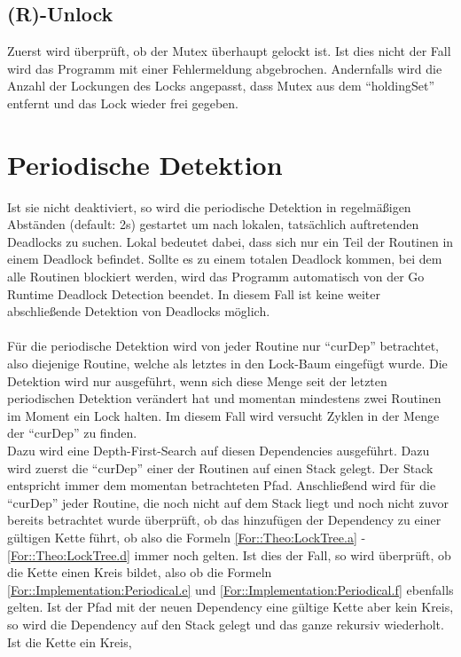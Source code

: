\subsection{(R)-Unlock}
Zuerst wird überprüft, ob der Mutex überhaupt gelockt ist. Ist dies nicht der 
Fall wird das Programm mit einer Fehlermeldung abgebrochen. Andernfalls
wird die Anzahl der Lockungen des Locks angepasst, dass Mutex aus dem 
``holdingSet'' entfernt und das Lock wieder frei gegeben.

\section{Periodische Detektion} \label{Kap::Implementation:Periodical}
Ist sie nicht deaktiviert, so wird die periodische Detektion in regelmäßigen 
Abständen (default: 2s) gestartet
um nach lokalen, tatsächlich auftretenden Deadlocks zu suchen. Lokal bedeutet 
dabei, dass sich nur ein Teil der Routinen in einem Deadlock befindet. Sollte 
es zu einem totalen Deadlock kommen, bei dem alle Routinen blockiert werden, 
wird das Programm automatisch von der Go Runtime Deadlock Detection beendet. In 
diesem Fall ist keine weiter abschließende Detektion von Deadlocks möglich.\\\\
Für die periodische Detektion wird von jeder Routine nur ``curDep'' betrachtet,
also diejenige Routine, welche als letztes in den Lock-Baum eingefügt wurde. 
Die Detektion wird nur ausgeführt, wenn sich diese Menge seit der letzten 
periodischen Detektion verändert hat und momentan mindestens zwei Routinen im 
Moment ein Lock halten.
Im diesem Fall wird versucht Zyklen in der Menge der ``curDep'' zu finden.\\
Dazu wird eine Depth-First-Search auf diesen Dependencies ausgeführt. Dazu wird 
zuerst die ``curDep'' einer der Routinen auf einen Stack gelegt. Der Stack 
entspricht immer dem momentan betrachteten Pfad. Anschließend wird für 
die ``curDep'' jeder Routine, die noch nicht auf dem Stack liegt und noch 
nicht zuvor bereits betrachtet wurde überprüft,
ob das hinzufügen der Dependency zu einer gültigen Kette führt, ob also 
die Formeln \ref{For::Theo:LockTree.a} - \ref{For::Theo:LockTree.d} immer noch 
gelten. Ist dies der Fall, so wird überprüft, ob die Kette einen Kreis 
bildet, also ob die Formeln \ref{For::Implementation:Periodical.e} und 
\ref{For::Implementation:Periodical.f} ebenfalls gelten. Ist der Pfad mit der 
neuen Dependency eine gültige Kette aber kein Kreis, so wird die Dependency
auf den Stack gelegt und das ganze rekursiv wiederholt. Ist die Kette ein Kreis,
